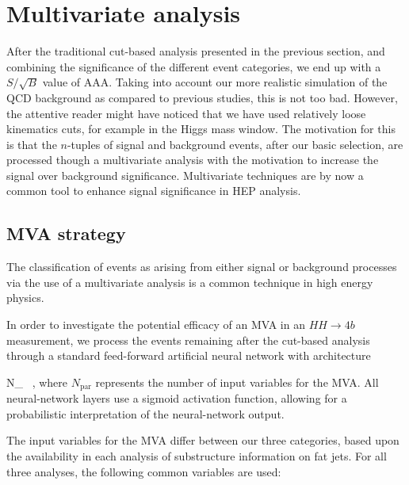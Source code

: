 
\section{Multivariate analysis}
\label{sec:mva}

After the traditional cut-based analysis presented in the previous section,
and combining the significance of the different event categories,
we end up with a $S/\sqrt{B}$ value of AAA.
%
Taking into account our more realistic simulation of the QCD background as
compared to previous studies, this is not too bad.
%
However, the attentive reader might have noticed that we have used
relatively 
loose kinematics cuts, for example in the Higgs mass window.
%
The motivation for this is that the $n$-tuples of signal and background
events, after our basic selection, are processed though a multivariate
analysis with the motivation to increase the signal over background
significance.
%
Multivariate techniques are by now a common tool to enhance signal
significance in HEP analysis.

\subsection{MVA strategy}

The classification of events as arising from either signal or
background processes via the use of a multivariate analysis is a common
technique in high energy physics.

In order to investigate the potential efficacy of an MVA in an $HH\to 4b$
measurement, we process the events remaining after the cut-based analysis 
through a standard feed-forward artificial neural network with architecture

\be
\label{eq:nn1}
N_{} \, ,
\ee
where $N_{\mathrm{par}}$ represents the number of input variables for the MVA.
All neural-network layers use a sigmoid activation function, allowing for a probabilistic
interpretation of the neural-network output.

The input variables for the MVA differ between our three categories, based upon
the availability in each analysis of substructure information on fat jets. For all
three analyses, the following common variables are used:

